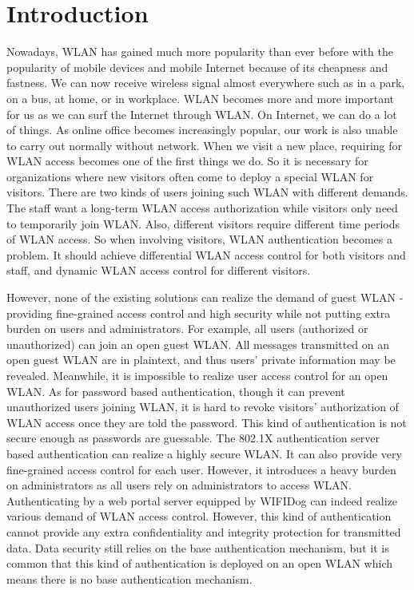 \section{Introduction}
Nowadays, WLAN has gained much more popularity than ever before with the popularity of mobile devices and mobile Internet because of its cheapness and fastness. We can now receive wireless signal almost everywhere such as in a park, on a bus, at home, or in workplace. WLAN becomes more and more important for us as we can surf the Internet through WLAN. On Internet, we can do a lot of things. As online office becomes increasingly popular, our work is also unable to carry out normally without network. When we visit a new place, requiring for WLAN access becomes one of the first things we do. So it is necessary for organizations where new visitors often come to deploy a special WLAN for visitors. There are two kinds of users joining such WLAN with different demands. The staff want a long-term WLAN access authorization while visitors only need to temporarily join WLAN. Also, different visitors require different time periods of WLAN access. So when involving visitors, WLAN authentication becomes a problem. It should achieve differential WLAN access control for both visitors and staff, and dynamic WLAN access control for different visitors. 

However, none of the existing solutions can realize the demand of guest WLAN - providing fine-grained access control and high security while not putting extra burden on users and administrators. For example, all users (authorized or unauthorized) can join an open guest WLAN. All messages transmitted on an open guest WLAN are in plaintext, and thus users’ private information may be revealed. Meanwhile, it is impossible to realize user access control for an open WLAN. As for password based authentication, though it can prevent unauthorized users joining WLAN, it is hard to revoke visitors’ authorization of WLAN access once they are told the password. This kind of authentication is not secure enough as passwords are guessable. The 802.1X authentication server based authentication can realize a highly secure WLAN. It can also provide very fine-grained access control for each user. However, it introduces a heavy burden on administrators as all users rely on administrators to access WLAN. Authenticating by a web portal server equipped by WIFIDog can indeed realize various demand of WLAN access control. However, this kind of authentication cannot provide any extra confidentiality and integrity protection for transmitted data. Data security still relies on the base authentication mechanism, but it is common that this kind of authentication is deployed on an open WLAN which means there is no base authentication mechanism. 


